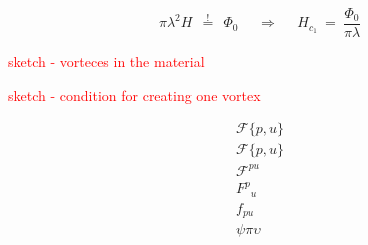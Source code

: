 \documentclass[10pt]{report}
\numberwithin{equation}{chapter}
\begin{document}
\begin{equation}
  \pi \lambda^2 H ~~\overset{!}{=}~~ \Phi_0 ~~~~~~\Rightarrow~~~~~~ H_{c_1} ~=~ \frac{\Phi_0}{\pi \lambda}
\end{equation}




\textcolor{red}{sketch - vorteces in the material}

\textcolor{red}{sketch - condition for creating one vortex}

\begin{align}
  \mathscr{F}\{p,u\}\\
  \mathcal{F}\{p,u\}\\
  \mathscr{F}^\mathit{pu}\\
  {F^p}_u\\
  f_{pu}\\
  \psi \pi \upsilon
\end{align}


\end{document}
